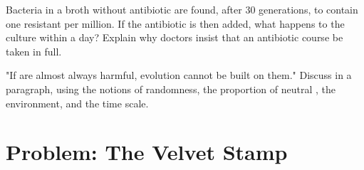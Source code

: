\begin{exercise}[$\star\star\star$]\label{exo:g11:mutations:14}
Bacteria in a broth without antibiotic are found, after 30
generations, to contain one resistant  per million. If the
antibiotic is then added, what happens to the culture within a day?
Explain why doctors insist that an antibiotic course be taken in full.
\end{exercise}

\begin{exercise}[$\star\star\star$]\label{exo:g11:mutations:15}
"If  are almost always harmful, evolution cannot be built on
them." Discuss in a paragraph, using the notions of randomness, the
proportion of neutral , the environment, and the time scale.
\end{exercise}

\section{Problem: The Velvet Stamp}


